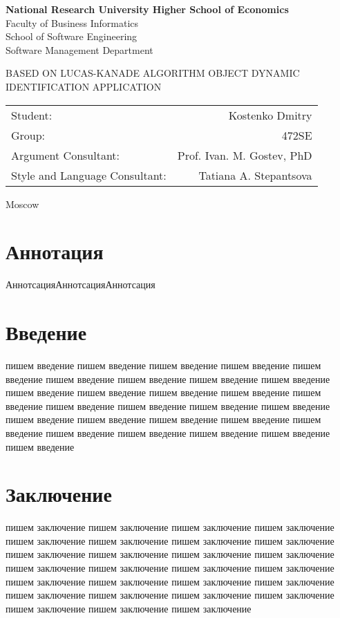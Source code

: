 \documentclass[12pt,a4paper,oneside,titlepage]{article}
\author{Kostenko}
\begin{document}
{
\thispagestyle{empty}
\newpage
\centering

\textbf{
National Research University Higher School of Economics\\
}
Faculty of Business Informatics\\
School of Software Engineering\\
Software Management Department

\vfill


\begin{large}
\MakeTextUppercase{
Based on Lucas-Kanade algorithm Object dynamic identification application
}
\end{large}


\vfill

\begin{tabular}{lr}
Student: & Kostenko Dmitry \\
Group: & 472SE \\
Argument Consultant: & Prof. Ivan. M. Gostev, PhD \\
Style and Language Consultant: & Tatiana A. Stepantsova
\end{tabular}

\vspace{\fill}

Moscow\\ \number\year
\clearpage
}

\newpage
\section*{Аннотация}
АннотсацияАннотсацияАннотсация


\newpage
\tableofcontents



\newpage
\section*{Введение}
пишем введение пишем введение пишем введение пишем введение пишем введение пишем введение пишем введение пишем введение пишем введение пишем введение пишем введение пишем введение пишем введение пишем введение пишем введение пишем введение пишем введение пишем введение пишем введение пишем введение пишем введение пишем введение пишем введение пишем введение пишем введение пишем введение пишем введение пишем введение 

\newpage
\section*{Заключение}
пишем заключение пишем заключение пишем заключение пишем заключение пишем заключение пишем заключение пишем заключение пишем заключение пишем заключение пишем заключение пишем заключение пишем заключение пишем заключение пишем заключение пишем заключение пишем заключение пишем заключение пишем заключение пишем заключение пишем заключение пишем заключение пишем заключение пишем заключение пишем заключение пишем заключение пишем заключение пишем заключение 
\end{document}
